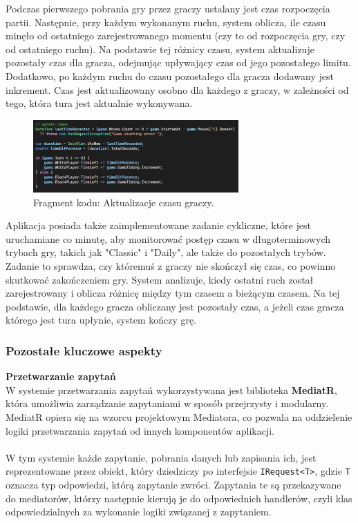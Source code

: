 \documentclass[12pt,a4paper]{article}
\begin{document}
\noindent
Podczas pierwszego pobrania gry przez graczy ustalany jest czas rozpoczęcia partii. Następnie, przy każdym wykonanym ruchu, system oblicza, ile czasu minęło od ostatniego zarejestrowanego momentu (czy to od rozpoczęcia gry, czy od ostatniego ruchu). Na podstawie tej różnicy czasu, system aktualizuje pozostały czas dla gracza, odejmując upływający czas od jego pozostałego limitu. Dodatkowo, po każdym ruchu do czasu pozostałego dla gracza dodawany jest inkrement. Czas jest aktualizowany osobno dla każdego z graczy, w zależności od tego, która tura jest aktualnie wykonywana.

\vspace{0.5cm}
\begin{figure}[h!]
    \centering
    \includegraphics[width=0.7\textwidth]{images/ex_update_times.png}
    \caption{Fragment kodu: Aktualizacje czasu graczy.}
\end{figure}
\vspace{0.5cm}

Aplikacja posiada także zaimplementowane zadanie cykliczne, które jest uruchamiane co minutę, aby monitorować postęp czasu w długoterminowych trybach gry, takich jak "Classic" i "Daily", ale także do pozostałych trybów. Zadanie to sprawdza, czy któremuś z graczy nie skończył się czas, co powinno skutkować zakończeniem gry. System analizuje, kiedy ostatni ruch został zarejestrowany i oblicza różnicę między tym czasem a bieżącym czasem. Na tej podstawie, dla każdego gracza obliczany jest pozostały czas, a jeżeli czas gracza którego jest tura upłynie, system kończy grę.

\newpage

\subsubsection{Pozostałe kluczowe aspekty}

\noindent \textbf{Przetwarzanie zapytań}\\
W systemie przetwarzania zapytań wykorzystywana jest biblioteka \textbf{MediatR}, która umożliwia zarządzanie zapytaniami w sposób przejrzysty i modularny. MediatR opiera się na wzorcu projektowym Mediatora, co pozwala na oddzielenie logiki przetwarzania zapytań od innych komponentów aplikacji.
\\\\
W tym systemie każde zapytanie, pobrania danych lub zapisania ich, jest reprezentowane przez obiekt, który dziedziczy po interfejsie \texttt{IRequest<T>}, gdzie \texttt{T} oznacza typ odpowiedzi, którą zapytanie zwróci. Zapytania te są przekazywane do mediatorów, którzy następnie kierują je do odpowiednich handlerów, czyli klas odpowiedzialnych za wykonanie logiki związanej z zapytaniem.
\\\\
\end{document}
